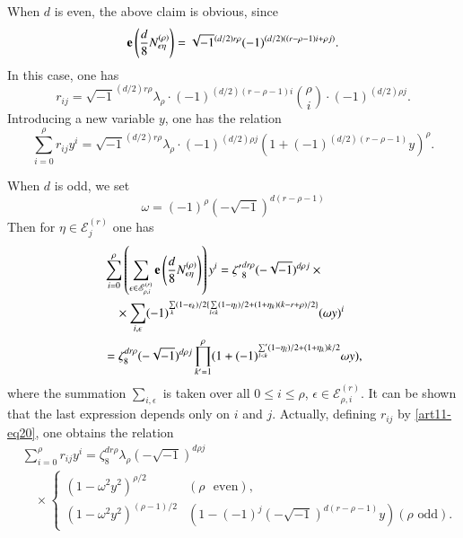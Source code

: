 When $d$ is even, the above claim is obvious, since
$$
\mathbf{e} \left(\dfrac{d}{8}N^{(\rho)}_{\epsilon\eta}\right)=\sqrt{-1}^{(d/2)r\rho}(-1)^{(d/2)((r-\rho-1)i+\rho j)}.
$$
In this case, one has
\begin{equation}
r_{ij}=\sqrt{-1}^{(d/2)r\rho}\lambda_{\rho}\cdot (-1)^{(d/2)(r-\rho-1)i}\binom{\rho}{i}\cdot (-1)^{(d/2)\rho j}.\label{art11-eq21}
\end{equation}
Introducing a new variable $y$, one has the relation
\begin{equation}
\sum\limits^{\rho}_{i=0}r_{ij}y^{i}=\sqrt{-1}^{(d/2)r\rho}\lambda_{\rho}\cdot (-1)^{(d/2)\rho j}(1+(-1)^{(d/2)(r-\rho-1)}y)^{\rho}.\label{art11-eq22}
\end{equation}

When $d$ is odd, we set
$$
\omega=(-1)^{\rho}(-\sqrt{-1})^{d(r-\rho-1)}
$$
Then for $\eta\in \mathscr{E}^{(r)}_{j}$ one has
\begin{align*}
& \sum\limits^{\rho}_{i=0}\left(\sum\limits_{\epsilon\in \mathscr{E}^{(r)}_{\rho,i}}\mathbf{e}\left(\dfrac{d}{8}N^{(\rho)}_{\epsilon\eta}\right)\right)y^{i}={\zeta'}_{8}^{dr\rho}(-\sqrt{-1})^{d\rho j}\times {}\\
&\quad {}\times \sum\limits_{i,\epsilon}(-1)^{\sum\limits_{k}(1-\epsilon_{k})/2\{\sum\limits_{l<k}(1-\eta_{l})/2+(1+\eta_{k})(k-r+\rho)/2\}}(\omega y)^{i}\\
&= \zeta^{dr\rho}_{8}(-\sqrt{-1})^{d\rho j}\prod\limits^{\rho}_{k'=1}(1+(-1)^{{\mathop{\sum'}\limits_{l<k}} (1-\eta_{l})/2+(1+\eta_{k})k/2}\omega y),
\end{align*}\pageoriginale
where the summation $\sum\limits_{i,\epsilon}$ is taken over all $0\leq i\leq \rho$, $\epsilon\in \mathscr{E}^{(r)}_{\rho,i}$. It can be shown that the last expression depends only on $i$ and $j$. Actually, defining $r_{ij}$ by \eqref{art11-eq20}, one obtains the relation
\begin{align*}
&\sum\limits^{\rho}_{i=0}r_{ij}y^{i} = \zeta_{8}^{dr\rho}\lambda_{\rho}(-\sqrt{-1})^{d\rho j}\tag*{$(22')$}\label{art11-eq22'}\\[3pt]
&\quad {}\times
\begin{cases}
(1-\omega^{2}y^{2})^{\rho/2} & (\rho \text{~ even}),\\
(1-\omega^{2}y^{2})^{(\rho-1)/2} & (1-(-1)^{j}(-\sqrt{-1})^{d(r-\rho-1)}y)(\rho \text{~odd}).
\end{cases}
\end{align*}

